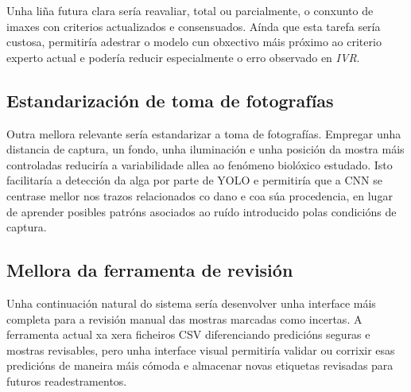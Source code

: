 Unha liña futura clara sería reavaliar, total ou parcialmente, o conxunto de imaxes con criterios
actualizados e consensuados. Aínda que esta tarefa sería custosa, permitiría adestrar o modelo cun
obxectivo máis próximo ao criterio experto actual e podería reducir especialmente o erro observado en
\textit{IVR}.

\subsection{Estandarización de toma de fotografías}
Outra mellora relevante sería estandarizar a toma de fotografías. Empregar unha distancia de captura,
un fondo, unha iluminación e unha posición da mostra máis controladas reduciría a variabilidade allea
ao fenómeno biolóxico estudado. Isto facilitaría a detección da alga por parte de YOLO e permitiría
que a CNN se centrase mellor nos trazos relacionados co dano e coa súa procedencia, en lugar de
aprender posibles patróns asociados ao ruído introducido polas condicións de captura.

\subsection{Mellora da ferramenta de revisión}
Unha continuación natural do sistema sería desenvolver unha interface máis completa para a revisión
manual das mostras marcadas como incertas. A ferramenta actual xa xera ficheiros CSV diferenciando
predicións seguras e mostras revisables, pero unha interface visual permitiría validar ou corrixir
esas predicións de maneira máis cómoda e almacenar novas etiquetas revisadas para futuros
readestramentos.
